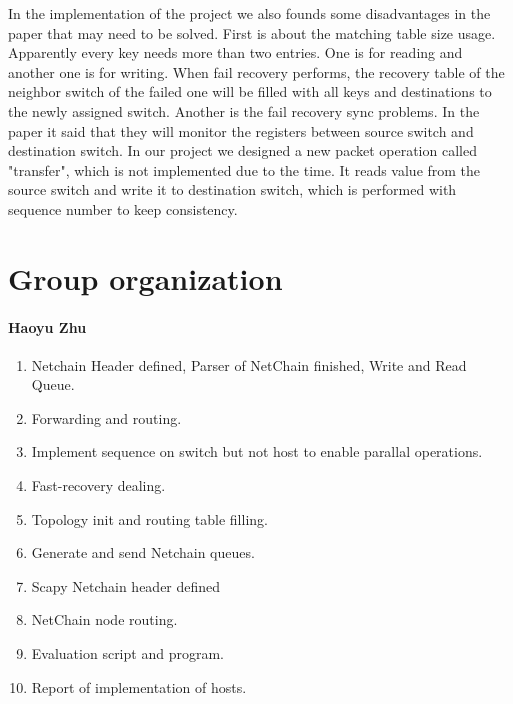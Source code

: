 \documentclass[11pt,oneside,a4paper]{article}
\begin{document}
In the implementation of the project we also founds some disadvantages in the paper that may need to be solved. First is about the matching table size usage. Apparently every key needs more than two entries. One is for reading and another one is for writing. When fail recovery performs, the recovery table of the neighbor switch of the failed one will be filled with all keys and destinations to the newly assigned switch. Another is the fail recovery sync problems. In the paper it said that they will monitor the registers between source switch and destination switch. In our project we designed a new packet operation called "transfer", which is not implemented due to the time. It reads value from the source switch and write it to destination switch, which is performed with sequence number to keep consistency.


\label{lastpage} %
\clearpage
{}



\clearpage
\appendix
{}

\section{Group organization}


\paragraph{Haoyu Zhu}

\begin{enumerate}
     \item Netchain Header defined, Parser of NetChain finished, Write and Read Queue.
    \item Forwarding and routing.
    \item Implement sequence on switch but not host to enable parallal operations.
    \item Fast-recovery dealing.
    \item Topology init and routing table filling.
    \item Generate and send Netchain queues.
    \item Scapy Netchain header defined
    \item NetChain node routing.
    \item Evaluation script and program.
    \item Report of implementation of hosts.
\end{enumerate}
 
\end{document}
